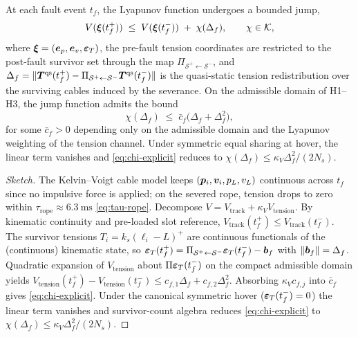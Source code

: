 \begin{lemma}
\label{lem:jump-continuity}
At each fault event $t_f$, the Lyapunov function undergoes a
bounded jump,
\begin{equation}
  V(\boldsymbol{\xi}(t_f^+))
    \;\le\;
    V(\boldsymbol{\xi}(t_f^-))
    \;+\; \chi(\Delta_f),
  \qquad
  \chi \in \mathcal{K},
  \label{eq:jump-bound}
\end{equation}
where $\boldsymbol{\xi} = (\boldsymbol{e}_p, \boldsymbol{e}_v, \boldsymbol{\varepsilon}_T)$,
the pre-fault tension coordinates are restricted to the
post-fault survivor set through the map
$\Pi_{\mathcal{S}^+\leftarrow\mathcal{S}^-}$, and
$\Delta_f = \|\boldsymbol{T}^{\mathrm{qs}}(t_f^+) -
\Pi_{\mathcal{S}^+\leftarrow\mathcal{S}^-}
\boldsymbol{T}^{\mathrm{qs}}(t_f^-)\|$ is the quasi-static tension
redistribution over the surviving cables induced by the
severance. On the admissible domain of H1--H3, the jump
function admits the bound
\begin{equation}
  \chi(\Delta_f)
    \;\le\;
    \bar c_f\bigl(\Delta_f + \Delta_f^2\bigr),
  \label{eq:chi-explicit}
\end{equation}
for some $\bar c_f > 0$ depending only on the admissible
domain and the Lyapunov weighting of the tension channel.
Under symmetric equal sharing at hover, the linear term
vanishes and \eqref{eq:chi-explicit} reduces to
$\chi(\Delta_f) \le \kappa_V\Delta_f^2/(2N_s)$.
\end{lemma}

\begin{proof}[Sketch]
The Kelvin--Voigt cable model keeps $(\boldsymbol{p}_i,\boldsymbol{v}_i,p_L,v_L)$ continuous across $t_f$ since no impulsive force is applied; on the severed rope, tension drops to zero within $\tau_{\mathrm{rope}}\approx\SI{6.3}{\milli\second}$ \eqref{eq:tau-rope}. Decompose $V=V_{\mathrm{track}}+\kappa_V V_{\mathrm{tension}}$. By kinematic continuity and pre-loaded slot reference, $V_{\mathrm{track}}(t_f^+)\le V_{\mathrm{track}}(t_f^-)$. The survivor tensions $T_i=k_s(\ell_i-L)^+$ are continuous functionals of the (continuous) kinematic state, so $\boldsymbol{\varepsilon}_T(t_f^+)=\Pi_{\mathcal{S}^+\leftarrow\mathcal{S}^-}\boldsymbol{\varepsilon}_T(t_f^-)-\boldsymbol{b}_f$ with $\|\boldsymbol{b}_f\|=\Delta_f$. Quadratic expansion of $V_{\mathrm{tension}}$ about $\Pi\boldsymbol{\varepsilon}_T(t_f^-)$ on the compact admissible domain yields $V_{\mathrm{tension}}(t_f^+)-V_{\mathrm{tension}}(t_f^-)\le c_{f,1}\Delta_f+c_{f,2}\Delta_f^2$. Absorbing $\kappa_V c_{f,j}$ into $\bar c_f$ gives \eqref{eq:chi-explicit}. Under the canonical symmetric hover ($\boldsymbol{\varepsilon}_T(t_f^-)=0$) the linear term vanishes and survivor-count algebra reduces \eqref{eq:chi-explicit} to $\chi(\Delta_f)\le\kappa_V\Delta_f^2/(2N_s)$.
\end{proof}

